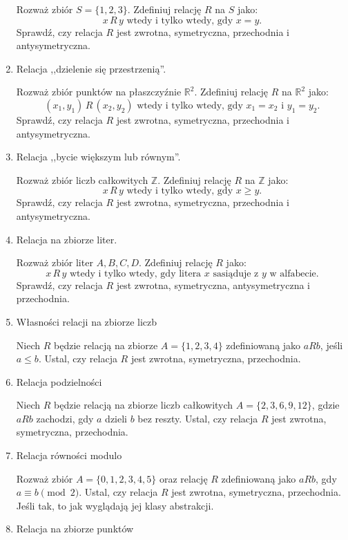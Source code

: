 \documentclass[12pt]{article}
\begin{document}
\begin{enumerate}
Rozważ zbiór $ S = \{1, 2, 3\} $. Zdefiniuj relację $ R $ na $ S $ jako:
\[
x \, R \, y \text{ wtedy i tylko wtedy, gdy } x = y.
\]
Sprawdź, czy relacja $ R $ jest zwrotna, symetryczna, przechodnia i antysymetryczna.

\item 
Relacja ,,dzielenie się przestrzenią''.

Rozważ zbiór punktów na płaszczyźnie $ \mathbb{R}^2 $. Zdefiniuj relację $ R $ na $ \mathbb{R}^2 $ jako:
\[
(x_1, y_1) \, R \, (x_2, y_2) \text{ wtedy i tylko wtedy, gdy } x_1 = x_2 \text{ i } y_1 = y_2.
\]
Sprawdź, czy relacja $ R $ jest zwrotna, symetryczna, przechodnia i antysymetryczna.

\item 
Relacja ,,bycie większym lub równym''.

Rozważ zbiór liczb całkowitych $ \mathbb{Z} $. Zdefiniuj relację $ R $ na $ \mathbb{Z} $ jako:
\[
x \, R \, y \text{ wtedy i tylko wtedy, gdy } x \geq y.
\]
Sprawdź, czy relacja $ R $ jest zwrotna, symetryczna, przechodnia i antysymetryczna.

\item 
 Relacja na zbiorze liter.

Rozważ zbiór liter $ A, B, C, D $. Zdefiniuj relację $ R $ jako:
\[
x \, R \, y \text{ wtedy i tylko wtedy, gdy litera } x \text{ sasiąduje z } y \text{ w alfabecie.}
\]
Sprawdź, czy relacja $ R $ jest zwrotna, symetryczna, antysymetryczna i przechodnia.

\item 
Własności relacji na zbiorze liczb  

Niech $ R $ będzie relacją na zbiorze $ A = \{1, 2, 3, 4\} $ zdefiniowaną jako $ a R b $, jeśli $ a \leq b $.  
Ustal, czy relacja $ R $ jest zwrotna, symetryczna, przechodnia.

\item 
Relacja podzielności  

Niech $ R $ będzie relacją na zbiorze liczb całkowitych $ A = \{2, 3, 6, 9, 12\} $, gdzie $ a R b $ zachodzi, gdy $ a $ dzieli $ b $ bez reszty.  
Ustal, czy relacja $ R $ jest zwrotna, symetryczna, przechodnia.

\item 
Relacja równości modulo  

Rozważ zbiór $ A = \{0, 1, 2, 3, 4, 5\} $ oraz relację $ R $ zdefiniowaną jako $ a R b $, gdy $ a \equiv b \pmod{2} $.  
Ustal, czy relacja $ R $ jest zwrotna, symetryczna, przechodnia.
Jeśli tak, to jak wyglądają jej klasy abstrakcji.
\item 
Relacja na zbiorze punktów  


\end{enumerate}
\end{document}
